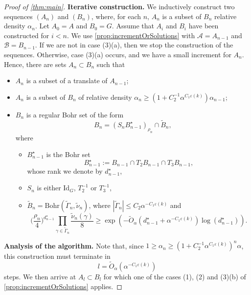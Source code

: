 \documentclass{daj}
\theoremstyle{definition}
\newcommand{\eps}{\varepsilon}
\newcommand{\A}{\ensuremath{\mathcal{A}}}
\newcommand{\B}{\ensuremath{\mathcal{B}}}
\begin{document}
\begin{proof}[Proof of \cref{thm:main}]
\medbreak\textbf{Iterative construction.}
We inductively construct two sequences $(A_n)$ and $(B_n)$, where, for each $n$, $A_n$ is a subset of $B_n$ relative density $\alpha_n$. Let $A_0 = A$ and $B_0 = G$. Assume that $A_i$ and $B_i$ have been constructed for $i<n$. We use \cref{prop:incrementOrSolutions} with $\A = A_{n-1}$ and $\B = B_{n-1}$. If we are not in case (3)(a), then we stop the construction of the sequences. Otherwise, case (3)(a) occurs, and we have a small increment for $A_n$. Hence, there are sets $A_n \subset B_n$ such that
\begin{itemize}
	\item $A_{n}$ is a subset of a translate of $A_{n-1}$;
	\item $A_n$ is a subset of $B_n$ of relative density $\alpha_n \geq \left(1+C_2^{-1}\alpha^{C_1\eps(k)}\right)\alpha_{n-1}$;
	\item $B_n$ is a regular Bohr set of the form 
	\begin{equation}
		\label{eq:inters1}
		B_n = (S_n B_{n-1}^{\star})_{\rho_n} \cap \widetilde{B}_{n},
	\end{equation}
	where \begin{itemize}
		\item $B_{n-1}^{\star}$ is the Bohr set
		\begin{equation}
		\label{eq:inters2}
		B_{n-1}^{\star}:= B_{n-1} \cap T_2 B_{n-1}\cap T_3 B_{n-1},
		\end{equation}
		whose rank we denote by $d_{n-1}^{\star}$,
		\item $S_n$ is either $\mathrm{Id}_G$, $T_2^{-1}$ or $T_3^{-1}$,
		\item $\widetilde{B}_n = \mathrm{Bohr}(\widetilde{\Gamma}_n, \widetilde{\nu}_n)$, where $|\widetilde{\Gamma}_{n}| \leq C_2\alpha^{-C_1\eps(k)}$ and 
	\begin{equation}
	\label{eq:boundwidth}
	\bigg(\frac{\rho_n}{4}\bigg)^{d_{n-1}^{\star}}\prod_{\gamma \in \widetilde{\Gamma}_n} \frac{\widetilde{\nu}_n(\gamma)}{8} \geq  \exp \left(-\tilde{O}_{\alpha} \left(d_{n-1}^{\star}+\alpha^{-C_1\eps(k)}\right) \log\left(d_{n-1}^{\star}\right)\right).
	\end{equation}
	\end{itemize}
\end{itemize}

\medbreak\textbf{Analysis of the algorithm.} Note that, since $1\geq \alpha_n \geq \left(1+C_2^{-1}\alpha^{C_1\eps(k)}\right)^n\alpha$, this construction must terminate in
\begin{equation*}
l = \tilde{O}_{\alpha}\left(\alpha^{-C_1\eps(k)}\right)
\end{equation*}
steps. We then arrive at $A_l\subset B_l$ for which one of the cases (1), (2) and (3)(b) of \cref{prop:incrementOrSolutions} applies. 



\end{proof}
\end{document}
